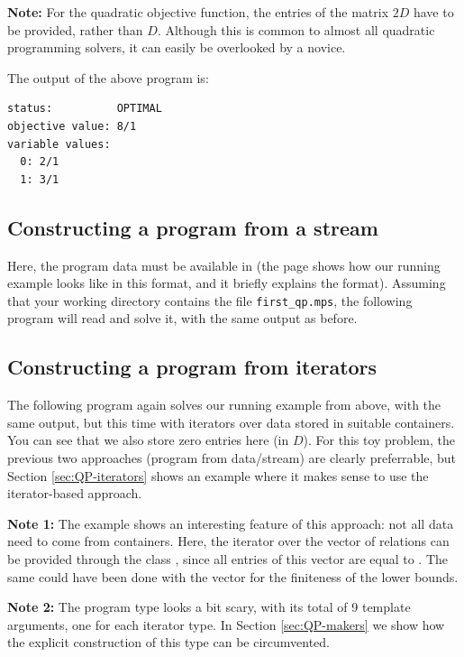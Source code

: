 {\bf Note:} For the quadratic objective function, the entries 
of the matrix $2D$ have to be provided, rather than $D$. Although 
this is common to almost all quadratic programming solvers, it 
can easily be overlooked by a novice.


The output of the above program is:
\begin{verbatim}
status:          OPTIMAL
objective value: 8/1
variable values:
  0: 2/1
  1: 3/1
\end{verbatim}

\subsection{Constructing a program from a stream}
Here, the program data must be available in  (the
 page shows how our running example looks like in
this format, and it briefly explains the format). Assuming that
your working directory contains the file \texttt{first\_qp.mps},
the following program will read and solve it, with the same output
as before.


\subsection{Constructing a program from iterators}
The following program again solves our running example from above,
with the same output, but this time with iterators over data stored 
in suitable containers. You can see that we also store zero 
entries here (in $D$). For this toy problem, the previous two
approaches (program from data/stream) are clearly preferrable, 
but Section \ref{sec:QP-iterators} shows an
example where it makes sense to use the iterator-based approach.


{\bf Note 1:} The example shows an interesting feature of this approach:
not all data need to come from containers. Here, the iterator over the
vector of relations can be provided through the class
, since all entries of this vector
are equal to . The same could have been done with
the vector  for the finiteness of the lower bounds. 

{\bf Note 2:} The program type looks a bit scary, with its total of
9 template arguments, one for each iterator type. In Section
\ref{sec:QP-makers} we show how the explicit construction of
this type can be circumvented.

